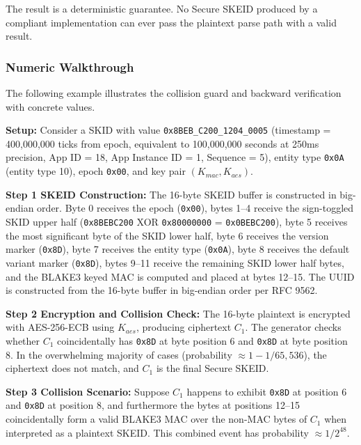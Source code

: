 \documentclass[fleqn,10pt,lineno]{wlpeerj}
\begin{document}
The result is a deterministic guarantee. No Secure SKEID produced by a
compliant implementation can ever pass the plaintext parse path with a
valid result.

\newpage

\subsubsection{Numeric Walkthrough}\label{numeric-walkthrough}

The following example illustrates the collision guard and backward
verification with concrete values.

\textbf{Setup:} Consider a SKID with value
\texttt{0x8BEB\_C200\_1204\_0005} (timestamp = 400,000,000 ticks from
epoch, equivalent to 100,000,000 seconds at 250ms precision, App ID =
18, App Instance ID = 1, Sequence = 5), entity type \texttt{0x0A}
(entity type 10), epoch \texttt{0x00}, and key pair
\((K_{mac}, K_{aes})\).

\textbf{Step 1 SKEID Construction:} The 16-byte SKEID buffer is
constructed in big-endian order. Byte 0 receives the epoch
(\texttt{0x00}), bytes 1--4 receive the sign-toggled SKID upper half
(\texttt{0x8BEBC200} XOR \texttt{0x80000000} = \texttt{0x0BEBC200}),
byte 5 receives the most significant byte of the SKID lower half, byte 6
receives the version marker (\texttt{0x8D}), byte 7 receives the entity
type (\texttt{0x0A}), byte 8 receives the default variant marker
(\texttt{0x8D}), bytes 9--11 receive the remaining SKID lower half
bytes, and the BLAKE3 keyed MAC is computed and placed at bytes 12--15.
The UUID is constructed from the 16-byte buffer in big-endian order per
RFC 9562.

\textbf{Step 2 Encryption and Collision Check:} The 16-byte plaintext is
encrypted with AES-256-ECB using \(K_{aes}\), producing ciphertext
\(C_1\). The generator checks whether \(C_1\) coincidentally has
\texttt{0x8D} at byte position 6 and \texttt{0x8D} at byte position 8.
In the overwhelming majority of cases (probability
\(\approx 1 - 1/65{,}536\)), the ciphertext does not match, and \(C_1\)
is the final Secure SKEID.

\textbf{Step 3 Collision Scenario:} Suppose \(C_1\) happens to exhibit
\texttt{0x8D} at position 6 and \texttt{0x8D} at position 8, and
furthermore the bytes at positions 12--15 coincidentally form a valid
BLAKE3 MAC over the non-MAC bytes of \(C_1\) when interpreted as a
plaintext SKEID. This combined event has probability
\(\approx 1/2^{48}\).
\end{document}
